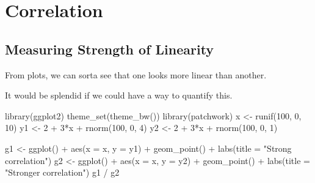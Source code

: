 \documentclass[
  letterpaper,
  DIV=11,
  numbers=noendperiod]{scrreprt}
\newenvironment{Shaded}{\begin{snugshade}}{\end{snugshade}}
\newcommand{\AttributeTok}[1]{\textcolor[rgb]{0.40,0.45,0.13}{#1}}
\newcommand{\DecValTok}[1]{\textcolor[rgb]{0.68,0.00,0.00}{#1}}
\newcommand{\FunctionTok}[1]{\textcolor[rgb]{0.28,0.35,0.67}{#1}}
\newcommand{\NormalTok}[1]{\textcolor[rgb]{0.00,0.23,0.31}{#1}}
\newcommand{\OtherTok}[1]{\textcolor[rgb]{0.00,0.23,0.31}{#1}}
\newcommand{\SpecialCharTok}[1]{\textcolor[rgb]{0.37,0.37,0.37}{#1}}
\newcommand{\StringTok}[1]{\textcolor[rgb]{0.13,0.47,0.30}{#1}}
\begin{document}
\hypertarget{correlation}{%
\chapter{Correlation}\label{correlation}}

\hypertarget{measuring-strength-of-linearity}{%
\section{Measuring Strength of
Linearity}\label{measuring-strength-of-linearity}}

\vspace{1cm}

From plots, we can sorta see that one looks more linear than another.

\pspace

It would be splendid if we could have a way to quantify this.

\begin{Shaded}
\begin{Highlighting}[]
\FunctionTok{library}\NormalTok{(ggplot2)}
\FunctionTok{theme\_set}\NormalTok{(}\FunctionTok{theme\_bw}\NormalTok{())}
\FunctionTok{library}\NormalTok{(patchwork)}
\NormalTok{x }\OtherTok{\textless{}{-}} \FunctionTok{runif}\NormalTok{(}\DecValTok{100}\NormalTok{, }\DecValTok{0}\NormalTok{, }\DecValTok{10}\NormalTok{)}
\NormalTok{y1 }\OtherTok{\textless{}{-}} \DecValTok{2} \SpecialCharTok{+} \DecValTok{3}\SpecialCharTok{*}\NormalTok{x }\SpecialCharTok{+} \FunctionTok{rnorm}\NormalTok{(}\DecValTok{100}\NormalTok{, }\DecValTok{0}\NormalTok{, }\DecValTok{4}\NormalTok{)}
\NormalTok{y2 }\OtherTok{\textless{}{-}} \DecValTok{2} \SpecialCharTok{+} \DecValTok{3}\SpecialCharTok{*}\NormalTok{x }\SpecialCharTok{+} \FunctionTok{rnorm}\NormalTok{(}\DecValTok{100}\NormalTok{, }\DecValTok{0}\NormalTok{, }\DecValTok{1}\NormalTok{)}

\NormalTok{g1 }\OtherTok{\textless{}{-}} \FunctionTok{ggplot}\NormalTok{() }\SpecialCharTok{+} \FunctionTok{aes}\NormalTok{(}\AttributeTok{x =}\NormalTok{ x, }\AttributeTok{y =}\NormalTok{ y1) }\SpecialCharTok{+} \FunctionTok{geom\_point}\NormalTok{() }\SpecialCharTok{+}
    \FunctionTok{labs}\NormalTok{(}\AttributeTok{title =} \StringTok{"Strong correlation"}\NormalTok{)}
\NormalTok{g2 }\OtherTok{\textless{}{-}} \FunctionTok{ggplot}\NormalTok{() }\SpecialCharTok{+} \FunctionTok{aes}\NormalTok{(}\AttributeTok{x =}\NormalTok{ x, }\AttributeTok{y =}\NormalTok{ y2) }\SpecialCharTok{+} \FunctionTok{geom\_point}\NormalTok{() }\SpecialCharTok{+}
    \FunctionTok{labs}\NormalTok{(}\AttributeTok{title =} \StringTok{"Stronger correlation"}\NormalTok{)}
\NormalTok{g1 }\SpecialCharTok{/}\NormalTok{ g2}
\end{Highlighting}
\end{Shaded}
\end{document}

